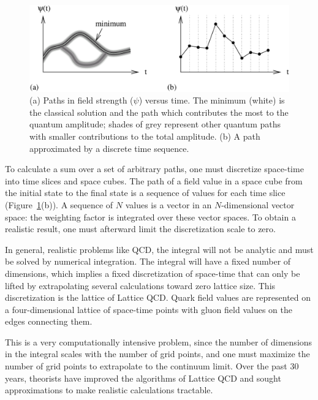 \documentclass{cornell}
\begin{document}
\begin{figure}[p]
  \begin{center}
    \includegraphics[width=\linewidth]{plots/pathintegrals}
  \end{center}
  \caption[Path integrals and path integrals in discretized
  space-time]{\label{pathintegrals} (a) Paths in field strength
  ($\psi$) versus time.  The minimum (white) is the classical solution
  and the path which contributes the most to the quantum amplitude;
  shades of grey represent other quantum paths with smaller
  contributions to the total amplitude.  (b) A path approximated by a
  discrete time sequence.}
\end{figure}

To calculate a sum over a set of arbitrary paths, one must discretize
space-time into time slices and space cubes.  The path of a field
value in a space cube from the initial state to the final state is a
sequence of values for each time slice (Figure~\ref{pathintegrals}(b)).
A sequence of $N$ values is a vector in an $N$-dimensional vector
space: the weighting factor is integrated over these vector spaces.
To obtain a realistic result, one must afterward limit the
discretization scale to zero.

In general, realistic problems like QCD, the integral will not be
analytic and must be solved by numerical integration.  The integral
will have a fixed number of dimensions, which implies a fixed
discretization of space-time that can only be lifted by extrapolating
several calculations toward zero lattice size.  This discretization is
the lattice of Lattice QCD.  Quark field values are represented on a
four-dimensional lattice of space-time points with gluon field values
on the edges connecting them.

This is a very computationally intensive problem, since the number of
dimensions in the integral scales with the number of grid points, and
one must maximize the number of grid points to extrapolate to the
continuum limit.  Over the past 30 years, theorists have improved the
algorithms of Lattice QCD and sought approximations to make realistic
calculations tractable.
\end{document}
